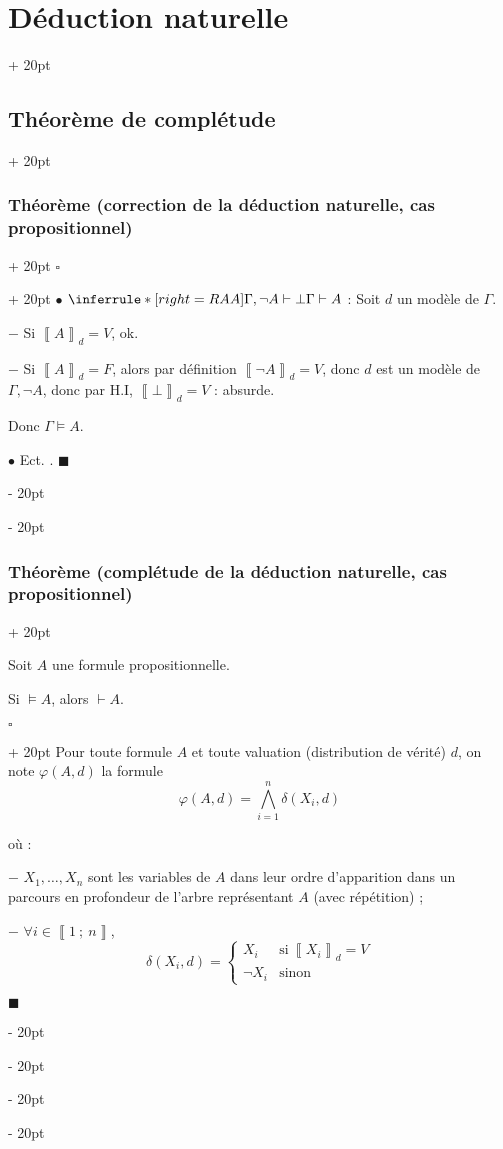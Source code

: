 \documentclass[a4paper, 12pt, twoside]{article}
\newcommand{\nset}[2]{\left\llbracket #1\ ;\ #2 \right\rrbracket}
\newcommand{\lrbb}[1]{\left\llbracket #1 \right\rrbracket}
\newcommand{\ind}[1][20pt]{\advance\leftskip + #1}
\newcommand{\deind}[1][20pt]{\advance\leftskip - #1}
\newenvironment{indt}[2][20pt]{#2 \par \ind[#1]}{\par \deind} %
\newenvironment{proof}[1][{}]{\begin{indt}{$\square$ #1}}{$\blacksquare$ \end{indt}}
\begin{document}
\begin{indt}{\section{Déduction naturelle}}
\begin{indt}{\subsection{Théorème de complétude}}
\begin{indt}{\subsubsection{Théorème (correction de la déduction naturelle, cas propositionnel)}}
\begin{proof}
                    $\bullet$ $\inferrule*[right={RAA}]{\Gamma, \neg A \vdash \bot}{\Gamma \vdash A}$ :
                    Soit $d$ un modèle de $\Gamma$.

                    $-$ Si $\lrbb A _d = V$, ok.

                    $-$ Si $\lrbb A _d = F$, alors par définition $\lrbb{\neg A}_d = V$, donc $d$ est un modèle de $\Gamma, \neg A$, donc par H.I, $\lrbb \bot _d = V$ : absurde.

                    Donc $\Gamma \vDash A$.

                    \vspace{6pt}
                    
                    $\bullet$ Ect. .
                \end{proof}
            \end{indt}

            \vspace{12pt}
            
            \begin{indt}{\subsubsection{Théorème (complétude de la déduction naturelle, cas propositionnel)}}
                \begin{emphBox}
                    Soit $A$ une formule propositionnelle.

                    Si $\vDash A$, alors $\vdash A$.
                \end{emphBox}

                \vspace{12pt}
                
                \begin{proof}
                    Pour toute formule $A$ et toute valuation (distribution de vérité) $d$, on note $\varphi(A, d)$ la formule
                    \[
                        \varphi(A, d)
                        =
                        \bigwedge_{i = 1}^n \delta(X_i, d)
                    \]

                    où :

                    $-$ $X_1, \ldots, X_n$ sont les variables de $A$ dans leur ordre d'apparition dans un parcours en profondeur de l'arbre représentant $A$ (avec répétition) ;

                    $-$ $\forall i \in \nset 1 n$,
                    \[
                        \delta(X_i, d)
                        =
                        \begin{cases}
                            X_i
                            & \text{si}\ \lrbb{X_i}_d = V
                            \\
                            \neg X_i
                            & \text{sinon}
                        \end{cases}
                    \]


\end{proof}
\end{indt}
\end{indt}
\end{indt}
\end{document}
